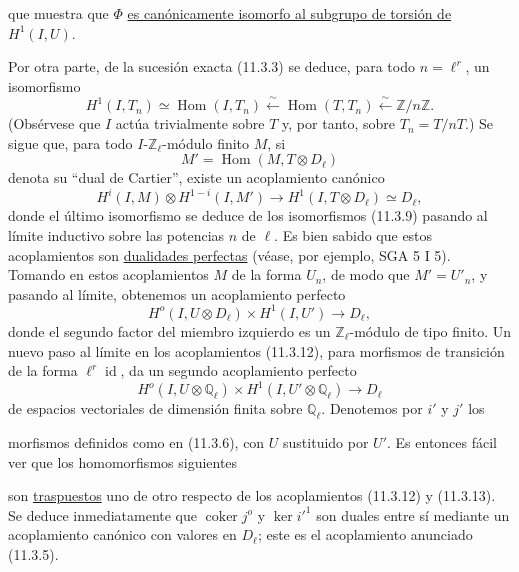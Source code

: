
que muestra que $\Phi$ \underline{es canónicamente isomorfo al
subgrupo de torsión de $H^1(I,U)$}.

Por otra parte, de la sucesión exacta (11.3.3) se deduce, para todo
$n=\ell^r$, un isomorfismo
\begin{equation}\tag{11.3.9}
H^1(I,T_n)\simeq\operatorname{Hom}(I,T_n)
 \xleftarrow{\sim}\operatorname{Hom}(T,T_n)
 \xleftarrow{\sim}\mathbb Z/n\mathbb Z.
\end{equation}
(Obsérvese que $I$ actúa trivialmente sobre $T$ y, por tanto, sobre
$T_n=T/nT$.) Se sigue que, para todo $I$-$\mathbb Z_\ell$-módulo finito
$M$, si
\begin{equation}\tag{11.3.10}
M'=\operatorname{Hom}(M,T\otimes D_\ell)
\end{equation}
denota su ``dual de Cartier'', existe un acoplamiento canónico
\begin{equation}\tag{11.3.11}
H^i(I,M)\otimes H^{1-i}(I,M')
 \longrightarrow H^1(I,T\otimes D_\ell)\simeq D_\ell,
\end{equation}
donde el último isomorfismo se deduce de los isomorfismos (11.3.9)
pasando al límite inductivo sobre las potencias $n$ de $\ell$. Es bien
sabido que estos acoplamientos son \underline{dualidades perfectas}
(véase, por ejemplo, SGA 5 I 5). Tomando en estos acoplamientos $M$ de
la forma $U_n$, de modo que $M'=U'_n$, y pasando al límite, obtenemos un
acoplamiento perfecto
\begin{equation}\tag{11.3.12}
H^o(I,U\otimes D_\ell)\times H^1(I,U')\longrightarrow D_\ell,
\end{equation}
donde el segundo factor del miembro izquierdo es un
$\mathbb Z_\ell$-módulo de tipo finito. Un nuevo paso al límite en los
acoplamientos (11.3.12), para morfismos de transición de la forma
$\ell^r\operatorname{id}$, da un segundo acoplamiento perfecto
\begin{equation}\tag{11.3.13}
H^o(I,U\otimes\mathbb Q_\ell)
 \times H^1(I,U'\otimes\mathbb Q_\ell)
 \longrightarrow D_\ell
\end{equation}
de espacios vectoriales de dimensión finita sobre $\mathbb Q_\ell$.
Denotemos por $i'$ y $j'$ los


morfismos definidos como en (11.3.6), con $U$ sustituido por $U'$. Es
entonces fácil ver que los homomorfismos siguientes
\begin{center}
\end{center}
son \underline{traspuestos} uno de otro respecto de los acoplamientos
(11.3.12) y (11.3.13). Se deduce inmediatamente que
$\operatorname{coker}j^o$ y $\ker {i'}^1$ son duales entre sí mediante
un acoplamiento canónico con valores en $D_\ell$; este es el
acoplamiento anunciado (11.3.5).
